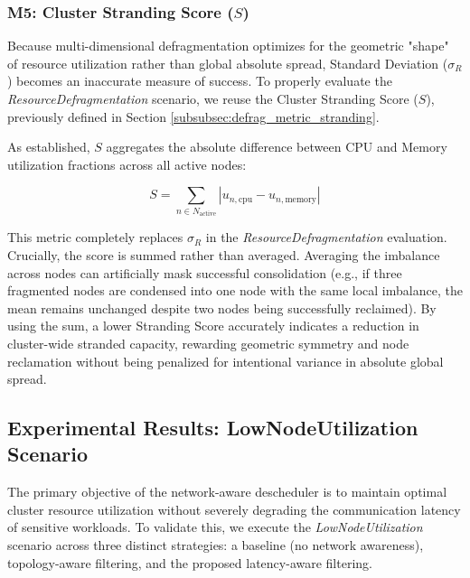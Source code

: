 \subsubsection{M5: Cluster Stranding Score (\(S\))}
\label{subsubsec:netaware4_evaluationmetrics5}
Because multi-dimensional defragmentation optimizes for the geometric "shape" of resource utilization rather than global absolute spread, Standard Deviation (\(\sigma_R\)) becomes an inaccurate measure of success. To properly evaluate the \textit{ResourceDefragmentation} scenario, we reuse the Cluster Stranding Score (\(S\)), previously defined in Section \ref{subsubsec:defrag_metric_stranding}.

As established, \(S\) aggregates the absolute difference between CPU and Memory utilization fractions across all active nodes:

\[
S = \sum_{n \in N_{\text{active}}} \left| u_{n,\text{cpu}} - u_{n,\text{memory}} \right|
\]

This metric completely replaces \(\sigma_R\) in the \textit{ResourceDefragmentation} evaluation. Crucially, the score is summed rather than averaged. Averaging the imbalance across nodes can artificially mask successful consolidation (e.g., if three fragmented nodes are condensed into one node with the same local imbalance, the mean remains unchanged despite two nodes being successfully reclaimed). By using the sum, a lower Stranding Score accurately indicates a reduction in cluster-wide stranded capacity, rewarding geometric symmetry and node reclamation without being penalized for intentional variance in absolute global spread.

\subsection{Experimental Results: LowNodeUtilization Scenario}
\label{subsec:netaware4_resultanalysis1}
The primary objective of the network-aware descheduler is to maintain optimal cluster resource utilization without severely degrading the communication latency of sensitive workloads. To validate this, we execute the \textit{LowNodeUtilization} scenario across three distinct strategies: a baseline (no network awareness), topology-aware filtering, and the proposed latency-aware filtering.

